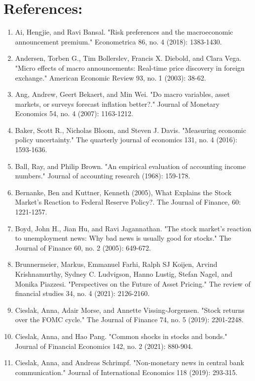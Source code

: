 \documentclass[12pt]{article}
\begin{document}
\section{References:}
\begin{enumerate}
    \item{Ai, Hengjie, and Ravi Bansal. "Risk preferences and the macroeconomic announcement premium." Econometrica 86, no. 4 (2018): 1383-1430.}
    \item{Andersen, Torben G., Tim Bollerslev, Francis X. Diebold, and Clara Vega. "Micro effects of macro announcements: Real-time price discovery in foreign exchange." American Economic Review 93, no. 1 (2003): 38-62.}
    \item{Ang, Andrew, Geert Bekaert, and Min Wei. "Do macro variables, asset markets, or surveys forecast inflation better?." Journal of Monetary Economics 54, no. 4 (2007): 1163-1212.}
    \item{Baker, Scott R., Nicholas Bloom, and Steven J. Davis. "Measuring economic policy uncertainty." The quarterly journal of economics 131, no. 4 (2016): 1593-1636.}
    \item{Ball, Ray, and Philip Brown. "An empirical evaluation of accounting income numbers." Journal of accounting research (1968): 159-178.}
    \item{Bernanke, Ben and Kuttner, Kenneth (2005), What Explains the Stock Market's Reaction to Federal Reserve Policy?. The Journal of Finance, 60: 1221-1257.}
    \item{Boyd, John H., Jian Hu, and Ravi Jagannathan. "The stock market's reaction to unemployment news: Why bad news is usually good for stocks." The Journal of Finance 60, no. 2 (2005): 649-672.}
    \item{Brunnermeier, Markus, Emmanuel Farhi, Ralph SJ Koijen, Arvind Krishnamurthy, Sydney C. Ludvigson, Hanno Lustig, Stefan Nagel, and Monika Piazzesi. "Perspectives on the Future of Asset Pricing." The review of financial studies 34, no. 4 (2021): 2126-2160.}
    \item{Cieslak, Anna, Adair Morse, and Annette Vissing‐Jorgensen. "Stock returns over the FOMC cycle." The Journal of Finance 74, no. 5 (2019): 2201-2248.}
    \item{Cieslak, Anna, and Hao Pang. "Common shocks in stocks and bonds." Journal of Financial Economics 142, no. 2 (2021): 880-904.}
    \item{Cieslak, Anna, and Andreas Schrimpf. "Non-monetary news in central bank communication." Journal of International Economics 118 (2019): 293-315.}

\end{enumerate}
\end{document}
